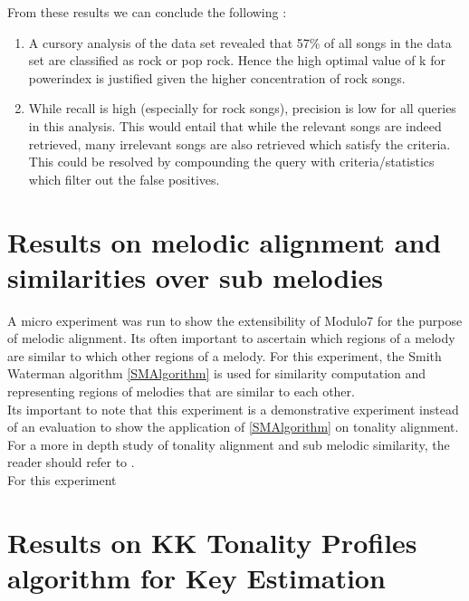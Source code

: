 From these results we can conclude the following : 

\begin{enumerate}
\item A cursory analysis of the data set revealed that 57\% of all songs in the data set are classified as rock or pop rock. Hence the high optimal value of k for powerindex is justified given the higher concentration of rock songs. 
\item While recall is high (especially for rock songs), precision is low for all queries in this analysis. This would entail that while the relevant songs are indeed retrieved, many irrelevant songs are also retrieved which satisfy the criteria. This could be resolved by compounding the query with criteria/statistics which filter out the false positives. 
\end{enumerate}

\section{Results on melodic alignment and similarities over sub melodies}

\noindent A micro experiment was run to show the extensibility of Modulo7 for the purpose of melodic alignment. Its often important to ascertain which regions of a melody are similar to which other regions of a melody. For this experiment, the Smith Waterman algorithm \ref{SMAlgorithm} is used for similarity computation and representing regions of melodies that are similar to each other. \\

\noindent Its important to note that this experiment is a demonstrative experiment instead of an evaluation to show the application of \ref{SMAlgorithm} on tonality alignment. For a more in depth study of tonality alignment and sub melodic similarity, the reader should refer to \cite{smithWatermanBook}.  \\

\noindent For this experiment 

\section{Results on KK Tonality Profiles algorithm for Key Estimation}

